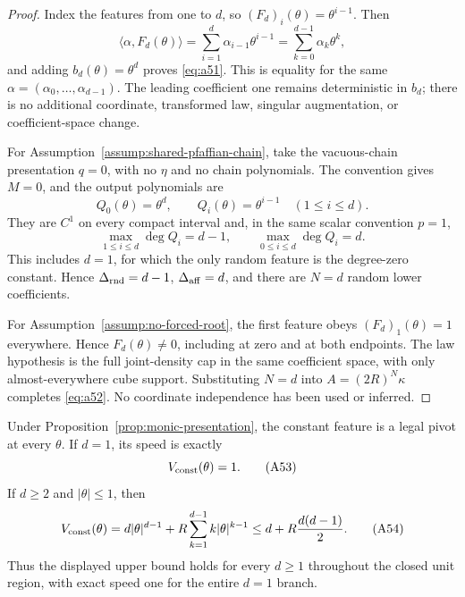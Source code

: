 \begin{proof}
Index the features from one to $d$, so $(F_d)_i(\theta)=\theta^{i-1}$.
Then
\[
\langle\alpha,F_d(\theta)\rangle
=\sum_{i=1}^d\alpha_{i-1}\theta^{i-1}
=\sum_{k=0}^{d-1}\alpha_k\theta^k,
\]
and adding $b_d(\theta)=\theta^d$ proves \eqref{eq:a51}.  This is equality
for the same $\alpha=(\alpha_0,\ldots,\alpha_{d-1})$.  The leading
coefficient one remains deterministic in $b_d$; there is no additional
coordinate, transformed law, singular augmentation, or coefficient-space
change.

For Assumption~\ref{assump:shared-pfaffian-chain}, take the vacuous-chain
presentation $q=0$, with no $\eta$ and no chain polynomials.  The convention
gives $M=0$, and the output polynomials are
\[
Q_0(\theta)=\theta^d,
\qquad Q_i(\theta)=\theta^{i-1}\quad(1\leq i\leq d).
\]
They are $C^1$ on every compact interval and, in the same scalar convention
$p=1$,
\[
\max_{1\leq i\leq d}\deg Q_i=d-1,
\qquad
\max_{0\leq i\leq d}\deg Q_i=d.
\]
This includes $d=1$, for which the only random feature is the degree-zero
constant.  Hence $\Delta_{\rm rnd}=d-1$, $\Delta_{\rm aff}=d$, and there
are $N=d$ random lower coefficients.

For Assumption~\ref{assump:no-forced-root}, the first feature obeys
$(F_d)_1(\theta)=1$ everywhere.  Hence $F_d(\theta)\neq0$, including at
zero and at both endpoints.  The law hypothesis is the full joint-density
cap in the same coefficient space, with only almost-everywhere cube support.
Substituting $N=d$ into $A=(2R)^N\kappa$ completes \eqref{eq:a52}.  No
coordinate independence has been used or inferred.
\end{proof}

\begin{lemma}
\label{lem:monic-constant-pivot}
Under Proposition~\ref{prop:monic-presentation}, the constant feature is a
legal pivot at every $\theta$.  If $d=1$, its speed is exactly
\[
V_{\rm const}(\theta)=1.
\tag{A53}\label{eq:a53}
\]
If $d\geq2$ and $|\theta|\leq1$, then
\[
V_{\rm const}(\theta)
=d|\theta|^{d-1}+R\sum_{k=1}^{d-1}k|\theta|^{k-1}
\leq d+R\frac{d(d-1)}2.
\tag{A54}\label{eq:a54}
\]
Thus the displayed upper bound holds for every $d\geq1$ throughout the
closed unit region, with exact speed one for the entire $d=1$ branch.
\end{lemma}

